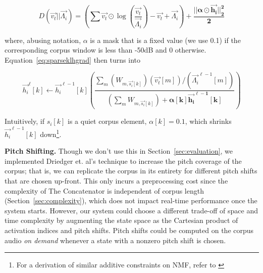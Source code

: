 \documentclass{article}
\begin{document}
\begin{equation}
    \label{eq:kllossalpha}
    D(\vec{v_t} || \vec{\Lambda_i}) = \left( \sum \vec{v_t} \odot \log \left( \frac{\vec{v_t}}{\vec{\Lambda_i}} \right) - \vec{v_t} + \vec{\Lambda_i} \right) + \boldsymbol{ \frac{||\alpha \odot \vec{h_i}||_2^2 }{2} }
    \end{equation}

where, abusing notation, $\alpha$ is a mask that is a fixed value (we use 0.1) if the corresponding corpus window is less than -50dB and $0$ otherwise.  Equation~\ref{eq:sparseklhgrad} then turns into 

\begin{equation}
    \label{eq:sparseklhgradalpha}
    \vec{h_i}^{\ell}[k]  \gets \vec{h_i}^{\ell-1}[k] \left(  \frac{\sum_m (W_{m, \vec{s_i}[k]}) (\vec{v_t}[m]) / (\vec{\Lambda_i}^{\ell-1}[m]) }{ (\sum_{m} W_{m, \vec{s_i}[k]}) + \boldsymbol{ \alpha[k] \vec{h_i}^{\ell-1}[k]}} \right)
\end{equation}

Intuitively, if $s_i[k]$ is a quiet corpus element, $\alpha[k] = 0.1$, which shrinks $\vec{h_i}^{\ell-1}[k]$ down\footnote{For a derivation of similar additive constraints on NMF, refer to \cite{virtanen2007monaural}}.




\textbf{Pitch Shifting.} Though we don't use this in Section~\ref{sec:evaluation}, we implemented Driedger et. al's technique to increase the pitch coverage of the corpus; that is, we can replicate the corpus in its entirety for different pitch shifts that are chosen up-front.  This only incurs a preprocessing cost since the complexity of The Concatenator is independent of corpus length (Section~\ref{sec:complexity}), which does not impact real-time performance once the system starts.  However, our system could choose a different trade-off of space and time complexity by augmenting the state space as the Cartesian product of activation indices and pitch shifts.  Pitch shifts could be computed on the corpus audio {\em on demand} whenever a state with a nonzero pitch shift is chosen.
\end{document}
